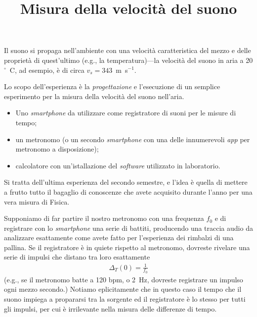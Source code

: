 \documentclass{lab1-article}
\title{Misura della velocit\`a del suono}
\begin{document}
\begin{article}

\maketitle

\secintro

Il suono si propaga nell'ambiente con una velocit\`a caratteristica del mezzo
e delle propriet\`a di quest'ultimo (e.g., la temperatura)---la velocit\`a del
suono in aria a 20$^\circ$~C, ad esempio, \`e di circa $v_s = 343$~m~s$^{-1}$.

Lo scopo dell'esperienza \`e la \emph{progettazione} e l'esecuzione di un
semplice esperimento per la misura della velocit\`a del suono nell'aria.

\secmaterialsdad

\begin{itemize}
  \item Uno \emph{smartphone} da utilizzare come registratore di suoni per
    le misure di tempo;
  \item un metronomo (o un secondo \emph{smartphone} con una delle innumerevoli
    \emph{app} per metronomo a disposizione);
  \item calcolatore con un'istallazione del \emph{software} utilizzato in
    laboratorio.
\end{itemize}


\secmeasurements

Si tratta dell'ultima esperienza del secondo semestre, e l'idea \`e quella di
mettere a frutto tutto il bagaglio di conoscenze che avete acquisito durante
l'anno per una vera misura di Fisica.

Supponiamo di far partire il nostro metronomo con una frequenza $f_0$ e di
registrare con lo \emph{smartphone} una serie di battiti, producendo una
traccia audio da analizzare esattamente come avete fatto per l'esperienza dei
rimbalzi di una pallina. Se il registratore \`e in quiete rispetto al
metronomo, dovreste rivelare una serie di impulsi che distano tra loro
esattamente
\begin{align*}
  \Delta_T(0) = \frac{1}{f_0}
\end{align*}
(e.g., se il metronomo batte a 120 bpm, o 2~Hz, dovreste registrare un impulso
ogni mezzo secondo.)
Notiamo eplicitamente che in questo caso il tempo che il suono impiega a
propararsi tra la sorgente ed il registratore \`e lo stesso per tutti gli
impulsi, per cui \`e irrilevante nella misura delle differenze di tempo.


\end{article}
\end{document}
